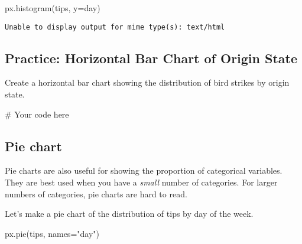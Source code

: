 \documentclass[
  letterpaper,
  DIV=11,
  numbers=noendperiod]{scrreprt}
\newenvironment{Shaded}{\begin{snugshade}}{\end{snugshade}}
\newcommand{\CommentTok}[1]{\textcolor[rgb]{0.37,0.37,0.37}{#1}}
\newcommand{\NormalTok}[1]{\textcolor[rgb]{0.00,0.23,0.31}{#1}}
\newcommand{\OperatorTok}[1]{\textcolor[rgb]{0.37,0.37,0.37}{#1}}
\newcommand{\StringTok}[1]{\textcolor[rgb]{0.13,0.47,0.30}{#1}}
\begin{document}
\begin{Shaded}
\begin{Highlighting}[]
\NormalTok{px.histogram(tips, y}\OperatorTok{=}\StringTok{\textquotesingle{}day\textquotesingle{}}\NormalTok{)}
\end{Highlighting}
\end{Shaded}

\begin{verbatim}
Unable to display output for mime type(s): text/html
\end{verbatim}

\begin{tcolorbox}[enhanced jigsaw, colframe=quarto-callout-tip-color-frame, opacityback=0, titlerule=0mm, bottomrule=.15mm, breakable, leftrule=.75mm, colbacktitle=quarto-callout-tip-color!10!white, title=\textcolor{quarto-callout-tip-color}{\faLightbulb}\hspace{0.5em}{Practice}, rightrule=.15mm, coltitle=black, opacitybacktitle=0.6, colback=white, left=2mm, arc=.35mm, toptitle=1mm, bottomtitle=1mm, toprule=.15mm]

\subsection{Practice: Horizontal Bar Chart of Origin
State}\label{practice-horizontal-bar-chart-of-origin-state}

Create a horizontal bar chart showing the distribution of bird strikes
by origin state.

\begin{Shaded}
\begin{Highlighting}[]
\CommentTok{\# Your code here}
\end{Highlighting}
\end{Shaded}

\end{tcolorbox}

\subsection{Pie chart}\label{pie-chart}

Pie charts are also useful for showing the proportion of categorical
variables. They are best used when you have a \emph{small} number of
categories. For larger numbers of categories, pie charts are hard to
read.

Let's make a pie chart of the distribution of tips by day of the week.

\begin{Shaded}
\begin{Highlighting}[]
\NormalTok{px.pie(tips, names}\OperatorTok{=}\StringTok{"day"}\NormalTok{)}
\end{Highlighting}
\end{Shaded}
\end{document}

